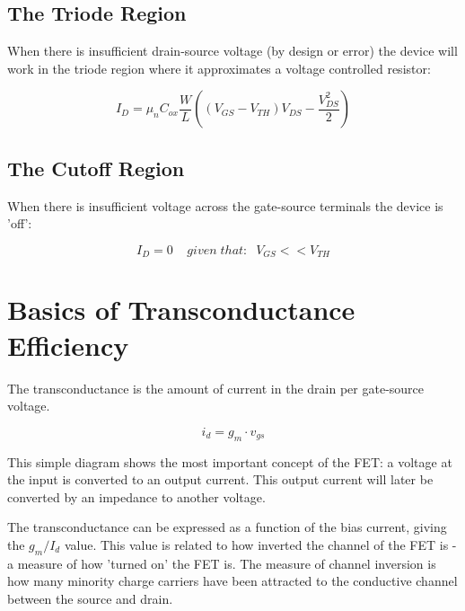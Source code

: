 \documentclass[11pt]{article}
\begin{document}
\subsection{The Triode Region}

When there is insufficient drain-source voltage (by design or error) the device will work in the triode region where it approximates a voltage controlled resistor:

\begin{equation}
I_D = \mu_n C_{ox} \frac{W}{L} \left( (V_{GS} - V_{TH}) V_{DS} - \frac{V_{DS}^2}{2} \right)
\end{equation}

\subsection{The Cutoff Region}

When there is insufficient voltage across the gate-source terminals the device is 'off':

\begin{equation}
I_D = 0 \;\;\;\; given \; that: \;\; V_{GS} << V_{TH}
\end{equation}



\section{Basics of Transconductance Efficiency}

The transconductance is the amount of current in the drain per gate-source voltage.

\begin{equation}
i_d = g_m \cdot v_{gs}
\end{equation}

This simple diagram shows the most important concept of the FET: a voltage at the input is converted to an output current. This output current will later be converted by an impedance to another voltage.

\begin{figure}[h]
\end{figure}


The transconductance can be expressed as a function of the bias current, giving the $g_m / I_d $ value. This value is related to how inverted the channel of the FET is - a measure of how 'turned on' the FET is. The measure of channel inversion is how many minority charge carriers have been attracted to the conductive channel between the source and drain.
\end{document}
